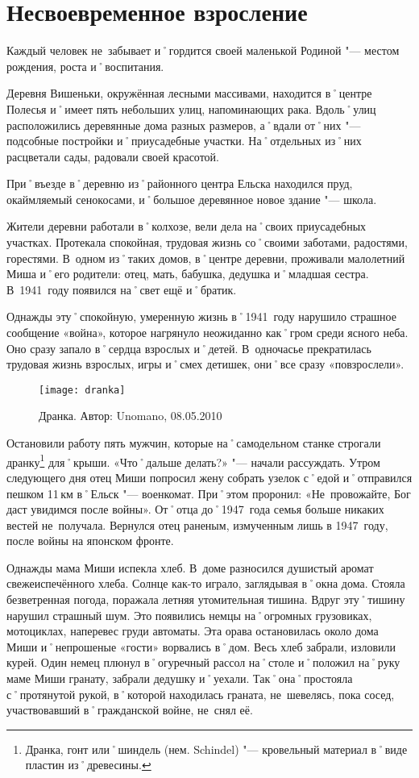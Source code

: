 ﻿\chapter{Несвоевременное взросление}
Каждый человек не~забывает и˚гордится своей маленькой Родиной "--- местом рождения, роста и˚воспитания.

Деревня Вишеньки, окружённая лесными массивами, находится в˚центре Полесья и˚имеет пять небольших улиц, напоминающих рака. Вдоль˚улиц расположились деревянные дома разных размеров, а˚вдали от˚них "--- подсобные постройки и˚приусадебные участки. На˚отдельных из˚них расцветали сады, радовали своей красотой.

При˚въезде в˚деревню из˚районного центра Ельска находился пруд, окаймляемый сенокосами, и˚большое деревянное новое здание "--- школа.

Жители деревни работали в˚колхозе, вели дела на˚своих приусадебных участках. Протекала спокойная, трудовая жизнь со˚своими заботами, радостями, горестями. В~одном из˚таких домов, в˚центре деревни, проживали малолетний Миша и˚его родители: отец, мать, бабушка, дедушка и˚младшая сестра. В~1941~году появился на˚свет ещё и˚братик. 

Однажды эту˚спокойную, умеренную жизнь в˚1941~году нарушило страшное сообщение «война», которое нагрянуло неожиданно как˚гром среди ясного неба. Оно сразу запало в˚сердца взрослых и˚детей. В~одночасье прекратилась трудовая жизнь взрослых, игры и˚смех детишек, они˚все сразу «повзрослели». 

\begin{wrapfigure}{O}{.4\textwidth}
\centering
\texttt{[image: dranka]}
\caption{Дранка. Автор: Unomano, 08.05.2010}
\label{fig:dranka}
\end{wrapfigure}

Остановили работу пять мужчин, которые на˚самодельном станке строгали дранку\footnote{Дранка, гонт или˚шиндель (нем. Schindel) "--- кровельный материал в˚виде пластин из˚древесины.} для˚крыши. «Что˚дальше делать?» "--- начали рассуждать. Утром следующего дня отец Миши попросил жену собрать узелок с˚едой и˚отправился пешком 11\,км в˚Ельск "--- военкомат. При˚этом проронил: «Не~провожайте, Бог даст увидимся после войны». От˚отца до˚1947~года семья больше никаких вестей не~получала. Вернулся отец раненым, измученным лишь в 1947~году, после войны на японском фронте. 

Однажды мама Миши испекла хлеб. В~доме разносился душистый аромат свежеиспечённого хлеба. Солнце как-то играло, заглядывая в˚окна дома. Стояла безветренная погода, поражала летняя утомительная тишина. Вдруг эту˚тишину нарушил страшный шум. Это появились немцы на˚огромных грузовиках, мотоциклах, наперевес груди автоматы. Эта орава остановилась около дома Миши и˚непрошеные «гости» ворвались в˚дом. Весь хлеб забрали, изловили курей. Один немец плюнул в˚огуречный рассол на˚столе и˚положил на˚руку маме Миши гранату, забрали дедушку и˚уехали. Так˚она˚простояла с˚протянутой рукой, в˚которой находилась граната, не~шевелясь, пока сосед, участвовавший в˚гражданской войне, не~снял её.


